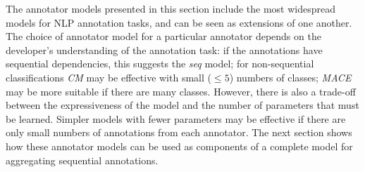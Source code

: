The annotator models presented in this section 
include the most widespread models for NLP annotation tasks, 
and can be seen as extensions of one another.
The choice of annotator model for a particular annotator
 depends on the developer's understanding of the annotation task: 
 if the annotations have sequential dependencies, this suggests the \emph{seq} model;
for non-sequential classifications \emph{CM} may be effective with small ($\leq 5$) 
numbers of classes; \emph{MACE} may be more suitable if there are many classes. 
However, there is also a trade-off between the expressiveness of the model and the
number of parameters that must be learned. Simpler models with fewer parameters
may be effective if there are only small numbers of annotations from each annotator. 
The next section shows how these annotator models can be used as components of 
a complete model for aggregating sequential annotations. 
